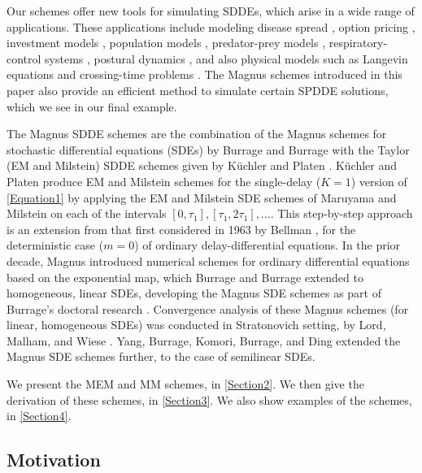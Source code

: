 \documentclass[onefignum]{siamart250211}
\begin{document}
Our schemes offer new tools for simulating SDDEs, which arise in a wide range of applications. These applications include modeling disease spread \cite{RihanAlsakaji2021,Shahid2024}, option pricing \cite{MaoSebanis2013,McWilliams2011,PangYong2019}, investment models \cite{Crandall2016,HeGuYao2024}, population models \cite{Mao2007,WangWangChen2019}, predator-prey models \cite{BaharMao2004,Rihan2020}, respiratory-control systems \cite{HartungTuri2013}, postural dynamics \cite{Boulet2010}, and also physical models such as Langevin equations and crossing-time problems \cite{Atay2010}. The Magnus schemes introduced in this paper also provide an efficient method to simulate certain SPDDE solutions, which we see in our final example.

The Magnus SDDE schemes are the combination of the Magnus schemes for stochastic differential equations (SDEs) by Burrage and Burrage \cite{BurrageBurrage1999} with the Taylor (EM and Milstein) SDDE schemes given by K\"uchler and Platen \cite{KuchlerPlaten2000}. K\"{u}chler and Platen produce EM and Milstein schemes for the single-delay ($K=1$) version of \cref{Equation1} by applying the EM and Milstein SDE schemes of Maruyama and Milstein \cite{Maruyama1955,Milstein1975} on each of the intervals $[0,\tau_1],[\tau_1,2\tau_1],\ldots$. This step-by-step approach is an extension from that first considered in 1963 by Bellman \cite{BellmanCooke1963}, for the deterministic case ($m=0$) of ordinary delay-differential equations. In the prior decade, Magnus \cite{Magnus1954} introduced numerical schemes for ordinary differential equations based on the exponential map, which Burrage and Burrage \cite{BurrageBurrage1999} extended to homogeneous, linear SDEs, developing the Magnus SDE schemes as part of Burrage's doctoral research \cite{Burrage1999}. Convergence analysis of these Magnus schemes (for linear, homogeneous SDEs) was conducted in Stratonovich setting, by Lord, Malham, and Wiese \cite{LordMalhamWiese2008}. Yang, Burrage, Komori, Burrage, and Ding \cite{BurrageBurrage2021} extended the Magnus SDE schemes further, to the case of semilinear SDEs.

We present the MEM and MM schemes, in \cref{Section2}. We then give the derivation of these schemes, in \cref{Section3}. We also show examples of the schemes, in \cref{Section4}.

\subsection{Motivation}
\end{document}
